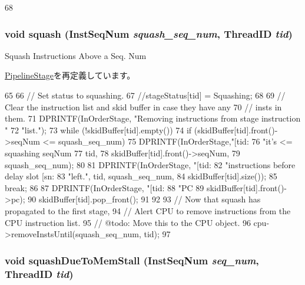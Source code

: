 \begin{DoxyCode}
68 {}
\end{DoxyCode}
\hypertarget{classFirstStage_ad9e3c0e17499440cfafb6145d7be97a1}{
\subsubsection[{squash}]{\setlength{\rightskip}{0pt plus 5cm}void squash ({\bf InstSeqNum} {\em squash\_\-seq\_\-num}, \/  {\bf ThreadID} {\em tid})}}
\label{classFirstStage_ad9e3c0e17499440cfafb6145d7be97a1}
Squash Instructions Above a Seq. Num 

\hyperlink{classPipelineStage_aee9dc23de90acd20200641407a3bd1da}{PipelineStage}を再定義しています。


\begin{DoxyCode}
65 {
66     // Set status to squashing.
67     //stageStatus[tid] = Squashing;
68 
69     // Clear the instruction list and skid buffer in case they have any
70     // insts in them.
71     DPRINTF(InOrderStage, "Removing instructions from stage instruction "
72             "list.\n");
73     while (!skidBuffer[tid].empty()) {
74         if (skidBuffer[tid].front()->seqNum <= squash_seq_num) {
75             DPRINTF(InOrderStage,"[tid:%
76                     "it's <= squashing seqNum %
77                     tid,
78                     skidBuffer[tid].front()->seqNum,
79                     squash_seq_num);
80 
81             DPRINTF(InOrderStage, "[tid:%
82                     "instructions before delay slot [sn:%
83                     "left.\n", tid, squash_seq_num,
84                     skidBuffer[tid].size());
85             break;
86         }
87         DPRINTF(InOrderStage, "[tid:%
88                 "PC %
89                 skidBuffer[tid].front()->pc);
90         skidBuffer[tid].pop_front();
91     }
92 
93     // Now that squash has propagated to the first stage,
94     // Alert CPU to remove instructions from the CPU instruction list.
95     // @todo: Move this to the CPU object.
96     cpu->removeInstsUntil(squash_seq_num, tid);
97 }
\end{DoxyCode}
\hypertarget{classFirstStage_a960b60a46045a5363df0c263f0f43902}{
\subsubsection[{squashDueToMemStall}]{\setlength{\rightskip}{0pt plus 5cm}void squashDueToMemStall ({\bf InstSeqNum} {\em seq\_\-num}, \/  {\bf ThreadID} {\em tid})}}
\label{classFirstStage_a960b60a46045a5363df0c263f0f43902}


